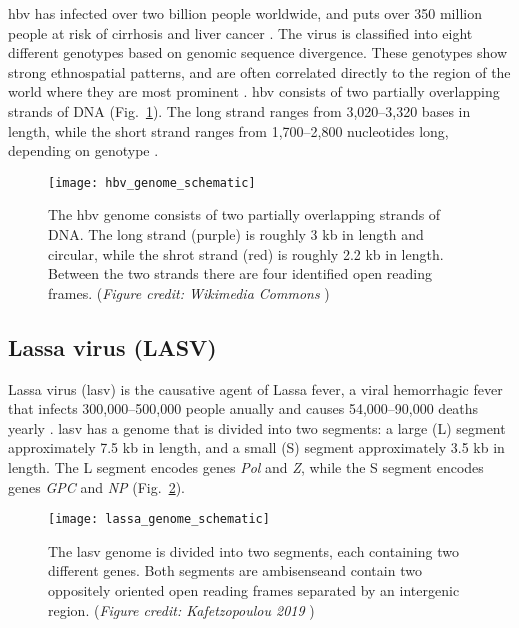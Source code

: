 \gls{hbv} has infected over two billion people worldwide, and puts over 350 million people at risk of cirrhosis and liver cancer \cite{kane1995global}.
The virus is classified into eight different genotypes based on genomic sequence divergence.
These genotypes show strong ethnospatial patterns, and are often correlated directly to the region of the world where they are most prominent \cite{schaefer2007hepatitis}.
\gls{hbv} consists of two partially overlapping strands of DNA (Fig.~\ref{fig:hbvGenome}).
The long strand ranges from 3,020--3,320 bases in length, while the short strand ranges from 1,700--2,800 nucleotides long, depending on genotype \cite{kay2007hepatitis}.

\begin{figure}[ht]
  \centering
  \medskip
  \texttt{[image: hbv\_genome\_schematic]}
  \caption[Scematic of the HBV genome]{The \gls{hbv} genome consists of two partially overlapping strands of DNA. The long strand (purple) is roughly 3 kb in length and circular, while the shrot strand (red) is roughly 2.2 kb in length. Between the two strands there are four identified open reading frames. (\textit{Figure credit: Wikimedia Commons} \cite{HBVwiki})}
  \label{fig:hbvGenome}
\end{figure}

\subsection{Lassa virus (LASV)}

Lassa virus (\gls{lasv}) is the causative agent of Lassa fever, a viral hemorrhagic fever that infects 300,000--500,000 people anually and causes 54,000--90,000 deaths yearly \cite{lianaThesis, asogun2012molecular}.
\gls{lasv} has a genome that is divided into two segments: a large (L) segment approximately 7.5 kb in length, and a small (S) segment approximately 3.5 kb in length.
The L segment encodes genes \textit{Pol} and \textit{Z}, while the S segment encodes genes \textit{GPC} and \textit{NP} (Fig.~\ref{fig:lasvGenome}).

\begin{figure}[ht]
  \centering
  \medskip
  \texttt{[image: lassa\_genome\_schematic]}
  \caption[Scematic of the LASV genome]{The \gls{lasv} genome is divided into two segments, each containing two different genes. Both segments are ambisenseand contain two oppositely oriented open reading frames separated by an intergenic region. (\textit{Figure credit: Kafetzopoulou 2019} \cite{lianaThesis})}
  \label{fig:lasvGenome}
\end{figure}

\cleardoublepage

